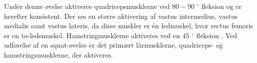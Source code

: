 Under denne øvelse aktiveres quadricepsmusklerne ved $80-90$ $^{\circ}$ fleksion og er herefter konsistent. Der ses en større aktivering af vastus intermedius, vastus medialis samt vastus lateris, da disse muskler er én ledmuskel, hvor rectus femoris er en to-ledsmuskel. Hamstringmusklerne aktiveres ved en $45$ $^{\circ}$ fleksion \citep{schoenfeld2010}. 
Ved udførelse af en squat-øvelse er det primært lårmusklerne, quadriceps- og hamstringsmusklerne, der aktiveres. 


